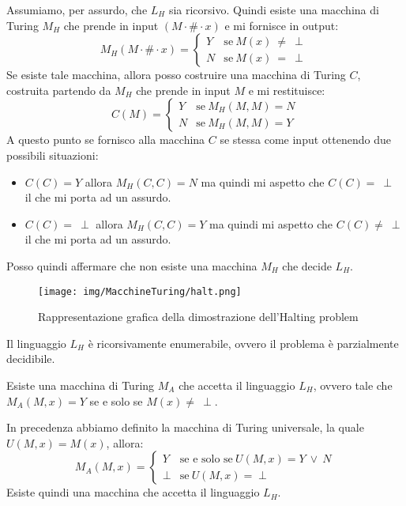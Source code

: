 \begin{dimostrazione} 
    Assumiamo, per assurdo, che $L_H$ sia ricorsivo. Quindi esiste una macchina
    di Turing $M_H$ che prende in input $(M \cdot \# \cdot x)$ e mi fornisce in output:
    \begin{equation}
        M_H (M \cdot \# \cdot x) = \begin{cases}
            Y & \text{se} \ M(x) \ \neq \ \perp \\
            N & \text{se} \ M(x) \  = \ \perp
        \end{cases}
    \end{equation}
    Se esiste tale macchina, allora posso costruire una macchina di Turing $C$,
    costruita partendo da $M_H$ che prende in input $M$ e mi restituisce:
    \begin{equation}
        C(M) = \begin{cases}
            Y & \text{se} \ M_H(M, M) = N \\
            N & \text{se} \ M_H(M, M) = Y
        \end{cases}
    \end{equation}
    A questo punto se fornisco alla macchina $C$ se stessa come input ottenendo
    due possibili situazioni:
    \begin{itemize}
        \item $C(C) = Y$ allora $M_H(C, C) = N$ ma quindi mi aspetto che
              $C(C)  = \ \perp$ il che mi porta ad un assurdo.
        \item $C(C) =\ \perp$ allora $M_H(C, C) =  Y$ ma quindi mi aspetto che
              $C(C)  \neq \ \perp$ il che mi porta ad un assurdo.
    \end{itemize}
    Posso quindi affermare che non esiste una macchina $M_H$ che decide $L_H$.
    \begin{figure}
        \centering
        \texttt{[image: img/MacchineTuring/halt.png]}
        \caption{Rappresentazione grafica della dimostrazione dell'Halting problem}
    \end{figure}
\end{dimostrazione}
\begin{teorema}
    Il linguaggio $L_H$ è ricorsivamente enumerabile, ovvero il problema è
    parzialmente decidibile.
\end{teorema}
\begin{dimostrazione}
    Esiste una macchina di Turing $M_A$ che accetta il linguaggio $L_H$, ovvero
    tale che $M_A(M, x) = Y$ se e solo se $M(x) \neq \ \perp$.

    In precedenza abbiamo definito la macchina di Turing universale, la quale
    $U(M, x) = M(x)$, allora:
    \begin{equation}
        M_A(M, x) = \begin{cases}
            Y     & \text{se e solo se} \ U(M, x) = Y \ \lor \ N \\
            \perp & \text{se} \ U(M, x) = \perp
        \end{cases}
    \end{equation}
    Esiste quindi una macchina che accetta il linguaggio $L_H$.
\end{dimostrazione}
